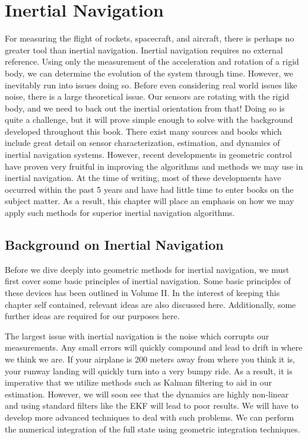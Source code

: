 \section{Inertial Navigation}
For measuring the flight of rockets, spacecraft, and aircraft, there is perhaps no greater tool than inertial navigation. Inertial navigation requires no external reference. Using only the measurement of the acceleration and rotation of a rigid body, we can determine the evolution of the system through time. However, we inevitably run into issues doing so. Before even considering real world issues like noise, there is a large theoretical issue. Our sensors are rotating with the rigid body, and we need to back out the inertial orientation from that! Doing so is quite a challenge, but it will prove simple enough to solve with the background developed throughout this book. There exist many sources and books which include great detail on sensor characterization, estimation, and dynamics of inertial navigation systems. However, recent developments in geometric control have proven very fruitful in improving the algorithms and methods we may use in inertial navigation. At the time of writing, most of these developments have occurred within the past 5 years and have had little time to enter books on the subject matter. As a result, this chapter will place an emphasis on how we may apply such methods for superior inertial navigation algorithms.

\subsection{Background on Inertial Navigation}
Before we dive deeply into geometric methods for inertial navigation, we must first cover some basic principles of inertial navigation. Some basic principles of these devices has been outlined in Volume II. In the interest of keeping this chapter self contained, relevant ideas are also discussed here. Additionally, some further ideas are required for our purposes here.

The largest issue with inertial navigation is the noise which corrupts our measurements. Any small errors will quickly compound and lead to drift in where we think we are. If your airplane is 200 meters away from where you think it is, your runway landing will quickly turn into a very bumpy ride. As a result, it is imperative that we utilize methods such as Kalman filtering to aid in our estimation. However, we will soon see that the dynamics are highly non-linear and using standard filters like the EKF will lead to poor results. We will have to develop more advanced techniques to deal with such problems. We can perform the numerical integration of the full state using geometric integration techniques.

